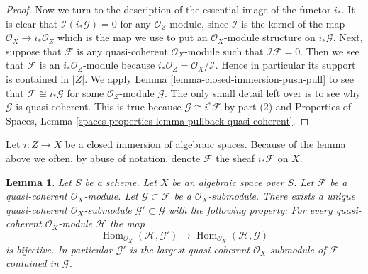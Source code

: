 \documentclass{stacks-project}
\theoremstyle{plain}
\newtheorem{lemma}[subsection]{Lemma}
\theoremstyle{definition}
\theoremstyle{remark}
\numberwithin{equation}{subsection}
\def\Hom{\mathop{\mathrm{Hom}}\nolimits}
\begin{document}
\begin{proof}
\medskip\noindent
Now we turn to the description of the essential image of the
functor $i_*$. It is clear that $\mathcal{I}(i_*\mathcal{G}) = 0$
for any $\mathcal{O}_Z$-module, since $\mathcal{I}$ is the kernel
of the map $\mathcal{O}_X \to i_*\mathcal{O}_Z$ which is the map
we use to put an $\mathcal{O}_X$-module structure on $i_*\mathcal{G}$.
Next, suppose that $\mathcal{F}$ is any quasi-coherent
$\mathcal{O}_X$-module such that $\mathcal{I}\mathcal{F} = 0$.
Then we see that $\mathcal{F}$ is an $i_*\mathcal{O}_Z$-module
because $i_*\mathcal{O}_Z = \mathcal{O}_X/\mathcal{I}$. Hence in
particular its support is contained in $|Z|$. We apply
Lemma \ref{lemma-closed-immersion-push-pull}
to see that $\mathcal{F} \cong i_*\mathcal{G}$ for some
$\mathcal{O}_Z$-module $\mathcal{G}$. The only small detail left over
is to see why $\mathcal{G}$ is quasi-coherent. This is true
because $\mathcal{G} \cong i^*\mathcal{F}$ by part (2) and
Properties of Spaces,
Lemma \ref{spaces-properties-lemma-pullback-quasi-coherent}.
\end{proof}

\noindent
Let $i : Z \to X$ be a closed immersion of algebraic spaces.
Because of the lemma above we often,
by abuse of notation, denote $\mathcal{F}$ the sheaf $i_*\mathcal{F}$ on $X$.

\begin{lemma}
\label{lemma-largest-quasi-coherent-subsheaf}
Let $S$ be a scheme. Let $X$ be an algebraic space over $S$.
Let $\mathcal{F}$ be a quasi-coherent $\mathcal{O}_X$-module.
Let $\mathcal{G} \subset \mathcal{F}$ be a $\mathcal{O}_X$-submodule.
There exists a unique quasi-coherent $\mathcal{O}_X$-submodule
$\mathcal{G}' \subset \mathcal{G}$ with the following property:
For every quasi-coherent $\mathcal{O}_X$-module $\mathcal{H}$ the map
$$
\Hom_{\mathcal{O}_X}(\mathcal{H}, \mathcal{G}')
\longrightarrow
\Hom_{\mathcal{O}_X}(\mathcal{H}, \mathcal{G})
$$
is bijective. In particular $\mathcal{G}'$ is the largest quasi-coherent
$\mathcal{O}_X$-submodule of $\mathcal{F}$ contained in $\mathcal{G}$.
\end{lemma}
\end{document}
